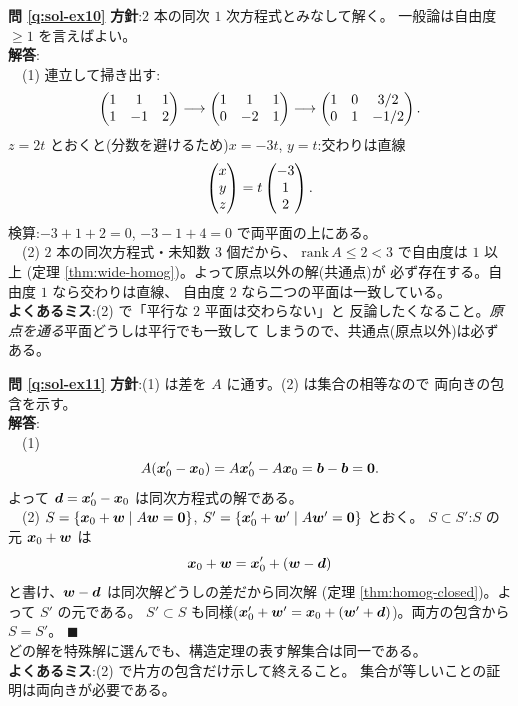 \bigskip
\noindent\textbf{問 \ref{q:sol-ex10}}\quad
\textbf{方針}:$2$ 本の同次 $1$ 次方程式とみなして解く。
一般論は自由度 $\ge 1$ を言えばよい。\\
\textbf{解答}:\\
　(1) 連立して掃き出す:
\[
\begin{pmatrix}1 & 1 & 1 \\ 1 & -1 & 2\end{pmatrix}
\longrightarrow
\begin{pmatrix}1 & 1 & 1 \\ 0 & -2 & 1\end{pmatrix}
\longrightarrow
\begin{pmatrix}1 & 0 & 3/2 \\ 0 & 1 & -1/2\end{pmatrix}.
\]
$z = 2t$ とおくと(分数を避けるため)$x = -3t$, $y = t$:交わりは直線
\[
\begin{pmatrix}x \\ y \\ z\end{pmatrix} = t\begin{pmatrix}-3 \\ 1 \\ 2\end{pmatrix}.
\]
検算:$-3 + 1 + 2 = 0$, $-3 - 1 + 4 = 0$ で両平面の上にある。\\
　(2) $2$ 本の同次方程式・未知数 $3$ 個だから、
$\mathrm{rank}\,A \le 2 < 3$ で自由度は $1$ 以上
(定理 \ref{thm:wide-homog})。よって原点以外の解(共通点)が
必ず存在する。自由度 $1$ なら交わりは直線、
自由度 $2$ なら二つの平面は一致している。\\
\textbf{よくあるミス}:(2) で「平行な $2$ 平面は交わらない」と
反論したくなること。\emph{原点を通る}平面どうしは平行でも一致して
しまうので、共通点(原点以外)は必ずある。

\bigskip
\noindent\textbf{問 \ref{q:sol-ex11}}\quad
\textbf{方針}:(1) は差を $A$ に通す。(2) は集合の相等なので
両向きの包含を示す。\\
\textbf{解答}:\\
　(1)
\[
A(\bm{x}_0' - \bm{x}_0) = A\bm{x}_0' - A\bm{x}_0
= \bm{b} - \bm{b} = \bm{0}.
\]
よって $\bm{d} = \bm{x}_0' - \bm{x}_0$ は同次方程式の解である。\\
　(2) $S = \{\bm{x}_0 + \bm{w} \mid A\bm{w} = \bm{0}\}$,
$S' = \{\bm{x}_0' + \bm{w}' \mid A\bm{w}' = \bm{0}\}$ とおく。
$S \subset S'$:$S$ の元 $\bm{x}_0 + \bm{w}$ は
\[
\bm{x}_0 + \bm{w} = \bm{x}_0' + (\bm{w} - \bm{d})
\]
と書け、$\bm{w} - \bm{d}$ は同次解どうしの差だから同次解
(定理 \ref{thm:homog-closed})。よって $S' $ の元である。
$S' \subset S$ も同様($\bm{x}_0' + \bm{w}' = \bm{x}_0 +
(\bm{w}' + \bm{d})$)。両方の包含から $S = S'$。 $\blacksquare$\\
どの解を特殊解に選んでも、構造定理の表す解集合は同一である。\\
\textbf{よくあるミス}:(2) で片方の包含だけ示して終えること。
集合が等しいことの証明は両向きが必要である。

